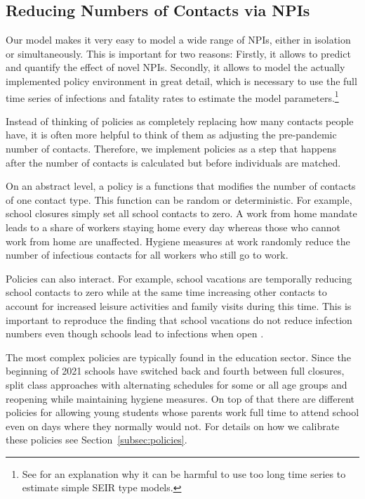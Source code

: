 \subsection{Reducing Numbers of Contacts via NPIs}
\label{sec:policies}

Our model makes it very easy to model a wide range of NPIs, either in isolation or
simultaneously. This is important for two reasons: Firstly, it allows to predict and
quantify the effect of novel NPIs. Secondly, it allows to model the actually implemented
policy environment in great detail, which is necessary to use the full time series
of infections and fatality rates to estimate the model parameters.\footnote{
See \citet{Avery2020} for an explanation why it can be harmful to use too long time
series to estimate simple SEIR type models.}


Instead of thinking of policies as completely replacing how many contacts people have,
it is often more helpful to think of them as adjusting the pre-pandemic number of
contacts. Therefore, we implement policies as a step that happens after the number of contacts is
calculated but before individuals are matched.

On an abstract level, a policy is a functions that modifies the number of contacts of
one contact type. This function can be random or deterministic. For example, school
closures simply set all school contacts to zero. A work from home mandate leads to a
share of workers staying home every day whereas those who cannot work from home are
unaffected. Hygiene measures at work randomly reduce the number of infectious contacts
for all workers who still go to work.

Policies can also interact. For example, school vacations are temporally reducing school
contacts to zero while at the same time increasing other contacts to account for
increased leisure activities and family visits during this time. This is important to
reproduce the finding that school vacations do not reduce infection numbers even though
schools lead to infections when open \citep{Isphording2021}.

The most complex policies are typically found in the education sector. Since the
beginning of 2021 schools have switched back and fourth between full closures, split
class approaches with alternating schedules for some or all age groups and reopening
while maintaining hygiene measures. On top of that there are different policies for
allowing young students whose parents work full time to attend school even on days where
they normally would not. For details on how we calibrate these policies see
Section~\ref{subsec:policies}.

